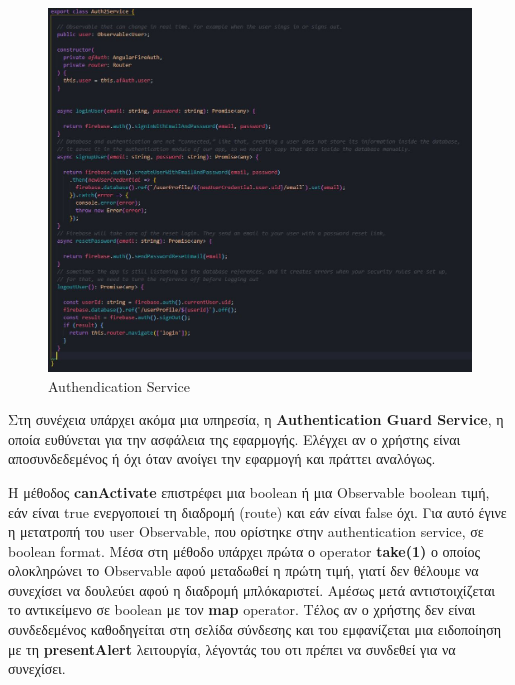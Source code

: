 \documentclass[a4paper,12pt]{article}
\begin{document}
			\begin{figure}[!htb]
				\begin{center}
					\caption{Authendication Service}
					\vspace*{0.5cm}

					\includegraphics[width=0.9\linewidth]{authService} 
				\end{center}
			\end{figure}

			\newpage
			Στη συνέχεια υπάρχει ακόμα μια υπηρεσία, η \textbf{Authentication Guard Service}, η οποία ευθύνεται για την ασφάλεια της εφαρμογής. Ελέγχει αν ο χρήστης είναι αποσυνδεδεμένος ή όχι όταν ανοίγει την εφαρμογή και πράττει αναλόγως.

			Η μέθοδος \textbf{canActivate} επιστρέφει μια boolean ή μια Observable boolean τιμή, εάν είναι true ενεργοποιεί τη 
			διαδρομή (route) και εάν είναι false όχι. Για αυτό έγινε η μετατροπή του user Observable, που ορίστηκε στην authentication service, σε boolean format.
			Μέσα στη μέθοδο υπάρχει πρώτα ο operator \textbf{take(1)} ο οποίος ολοκληρώνει το Observable αφού μεταδωθεί η πρώτη τιμή, γιατί δεν θέλουμε να συνεχίσει να δουλεύει 
			αφού η διαδρομή μπλόκαριστεί. Αμέσως μετά αντιστοιχίζεται το αντικείμενο σε boolean με τον \textbf{map} operator. Τέλος αν ο χρήστης δεν είναι συνδεδεμένος 
			καθοδηγείται στη σελίδα σύνδεσης και του εμφανίζεται μια ειδοποίηση με τη \textbf{presentAlert} λειτουργία, λέγοντάς του οτι πρέπει να συνδεθεί για να συνεχίσει.
\end{document}
